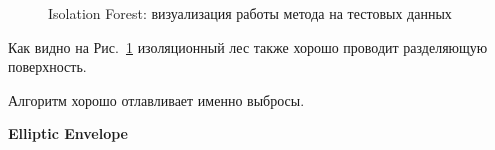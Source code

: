\documentclass[12pt]{article}
\begin{document}
    \begin{figure}[h!]
        \centering
        \caption{Isolation Forest: визуализация работы метода на тестовых данных}
        \label{sec:Research:Model:Visualization:fig:IsolationForest}
    \end{figure}

    \par Как видно на Рис.~\ref{sec:Research:Model:Visualization:fig:IsolationForest} изоляционный лес также хорошо проводит разделяющую поверхность. \\
    \par Алгоритм хорошо отлавливает именно выбросы.

    \newpage


    \textbf{Elliptic Envelope} \\
\end{document}
